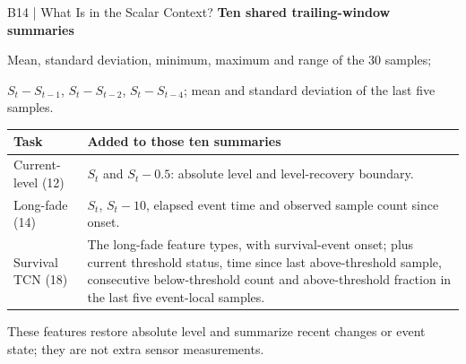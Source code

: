 \begin{frame}[noframenumbering]{B14 | What Is in the Scalar Context?}
\small
\textbf{Ten shared trailing-window summaries}\par\vspace{1mm}
Mean, standard deviation, minimum, maximum and range of the 30 samples;\par
$S_t-S_{t-1}$, $S_t-S_{t-2}$, $S_t-S_{t-4}$; mean and standard deviation of the last five samples.\par
\vspace{3mm}
\renewcommand{\arraystretch}{1.35}
\begin{tabularx}{\textwidth}{@{}>{\raggedright\arraybackslash}p{31mm}>{\raggedright\arraybackslash}X@{}}
\toprule
Task & Added to those ten summaries\\\midrule
Current-level (12) & $S_t$ and $S_t-0.5$: absolute level and level-recovery boundary.\\
Long-fade (14) & $S_t$, $S_t-10$, elapsed event time and observed sample count since onset.\\
Survival TCN (18) & The long-fade feature types, with survival-event onset; plus current threshold status, time since last above-threshold sample, consecutive below-threshold count and above-threshold fraction in the last five event-local samples.\\
\bottomrule
\end{tabularx}
\par\vspace{3mm}
These features restore absolute level and summarize recent changes or event state; they are not extra sensor measurements.
\end{frame}
